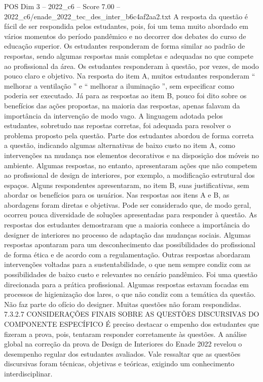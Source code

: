 \begin{textsample}{POS Dim 3 – 2022\_c6 – Score 7.00 – 2022\_c6/enade\_2022\_tec\_des\_inter\_b6c4af2aa2.txt}
A resposta da questão é fácil de ser respondida pelos estudantes, pois, foi um tema muito abordado em vários momentos do período pandêmico e no decorrer dos debates do curso de educação superior.
Os estudantes responderam de forma similar ao padrão de respostas, sendo algumas respostas mais completas e adequadas no que compete ao profissional da área.
Os estudantes responderam à questão, por vezes, de modo pouco claro e objetivo.
Na resposta do item A, muitos estudantes responderam “ melhorar a ventilação ” e “ melhorar a iluminação ”, sem especificar como poderia ser executado.
Já para as respostas ao item B, pouco foi dito sobre os benefícios das ações propostas, na maioria das respostas, apenas falavam da importância da intervenção de modo vago.
A linguagem adotada pelos estudantes, sobretudo nas repostas corretas, foi adequada para resolver o problema proposto pela questão.
Parte dos estudantes abordou de forma correta a questão, indicando algumas alternativas de baixo custo no item A, como intervenções na mudança nos elementos decorativos e na disposição dos móveis no ambiente.
Algumas respostas, no entanto, apresentaram ações que não competem ao profissional de design de interiores, por exemplo, a modificação estrutural dos espaços.
Alguns respondentes apresentaram, no item B, suas justificativas, sem abordar os benefícios para os usuários.
Nas respostas aos itens A e B, as abordagens foram diretas e objetivas.
Pode ser considerado que, de modo geral, ocorreu pouca diversidade de soluções apresentadas para responder à questão.
As respostas dos estudantes demostraram que a maioria conhece a importância do designer de interiores no processo de adaptação das mudanças sociais.
Algumas respostas apontaram para um desconhecimento das possibilidades do profissional de forma ética e de acordo com a regulamentação.
Outras respostas abordaram intervenções voltadas para a sustentabilidade, o que nem sempre condiz com as possibilidades de baixo custo e relevantes no cenário pandêmico.
Foi uma questão direcionada para a prática profissional.
Algumas respostas estavam focadas em processos de higienização dos lares, o que não condiz com a temática da questão.
Não faz parte do ofício do designer.
Muitas questões não foram respondidas. 7.3.2.7 CONSIDERAÇÕES FINAIS SOBRE AS QUESTÕES DISCURSIVAS DO COMPONENTE ESPECÍFICO É preciso destacar o empenho dos estudantes que fizeram a prova, pois, tentaram responder corretamente às questões.
A análise global na correção da prova de Design de Interiores do Enade 2022 revelou o desempenho regular dos estudantes avaliados.
Vale ressaltar que as questões discursivas foram técnicas, objetivas e teóricas, exigindo um conhecimento interdisciplinar.

\end{textsample}
